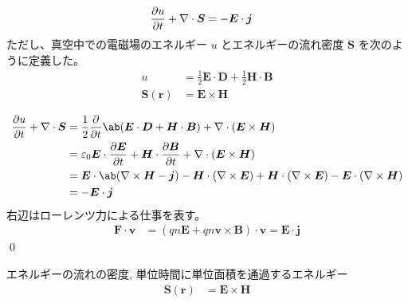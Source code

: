 \documentclass[uplatex,dvipdfmx,a4paper,11pt]{jlreq}
\makeatletter
\newcommand{\EE}{\bm{E}}
\newcommand{\BB}{\bm{B}}
\newcommand{\DD}{\bm{D}}
\newcommand{\HH}{\bm{H}}
\newcommand{\rr}{\bm{r}}
\renewcommand{\SS}{\bm{S}}
\newcommand{\vnabla}{\mathbf{\nabla}}
\numberwithin{equation}{section}
\theoremstyle{definition}
\renewenvironment{proof}[1][\proofname]{\par
  \normalfont
  \topsep6\p@\@plus6\p@ \trivlist
  \item[\hskip\labelsep{\bfseries #1}\@addpunct{\bfseries}]\ignorespaces\quad\par
}{%
  \qed\endtrivlist\@endpefalse
}
\renewcommand\proofname{証明}
\makeatother
\begin{document}
\begin{theorem}[エネルギー保存則]
  \begin{align}
    \diffp{u}{t} + \vnabla\cdot\SS & = -\EE\cdot\bm{j}
  \end{align}
  ただし、真空中での電磁場のエネルギー $u$ とエネルギーの流れ密度 $\SS$ を次のように定義した。
  \begin{align}
    u        & = \frac{1}{2}\EE\cdot\DD + \frac{1}{2}\HH\cdot\BB \\
    \SS(\rr) & = \EE\times\HH
  \end{align}
\end{theorem}
\begin{proof}
  \begin{align}
    \diffp{u}{t} + \vnabla\cdot\SS & = \frac{1}{2}\diffp{}{t}\ab(\EE\cdot\DD + \HH\cdot\BB) + \vnabla\cdot(\EE\times\HH)                                             \\
                                   & = \varepsilon_0\EE\cdot\diffp{\EE}{t} + \HH\cdot\diffp{\BB}{t} + \vnabla\cdot(\EE\times\HH)                                     \\
                                   & = \EE\cdot\ab(\vnabla\times\HH - \bm{j}) - \HH\cdot(\vnabla\times\EE) + \HH\cdot(\vnabla\times\EE) - \EE\cdot(\vnabla\times\HH) \\
                                   & = -\EE\cdot\bm{j}
  \end{align}
  右辺はローレンツ力による仕事を表す。
  \begin{align}
    \bm{F}\cdot\bm{v} & = (qn\EE + qn\bm{v}\times\BB)\cdot\bm{v} = \EE\cdot\bm{j}
  \end{align}
\end{proof}

\begin{definition}
  エネルギーの流れの密度, 単位時間に単位面積を通過するエネルギー
  \begin{align}
    \SS(\rr) & = \EE\times\HH
  \end{align}
\end{definition}
\end{document}
